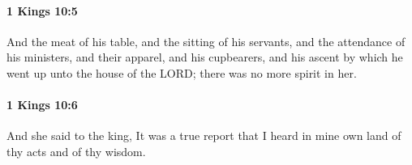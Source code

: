 		\paragraph{1 Kings 10:5} %
			\label{1KINGS-10-5}

			And the meat of his table, and the sitting of his servants, and the attendance of his ministers, and their apparel, and his cupbearers, and his ascent by which he went up unto the house of the LORD; there was no more spirit in her.


		\paragraph{1 Kings 10:6} %
			\label{1KINGS-10-6}

			And she said to the king, It was a true report that I heard in mine own land of thy acts and of thy wisdom.


